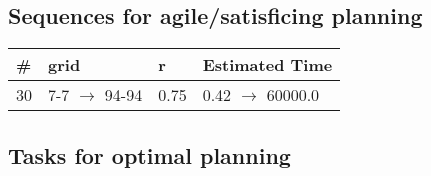 \documentclass{article}
\begin{document}
                         \subsection*{Sequences for agile/satisficing planning}

                        \begin{center}
                        \begin{tabular}{@{}l|l|l|l@{}}
                        \# & grid & r & Estimated Time\\\midrule
                        30&7-7 $\rightarrow$ 94-94&0.75&0.42 $\rightarrow$ 60000.0
                        \end{tabular}
                        \end{center}
                    
                                \subsection*{Tasks for optimal planning}
                                
\end{document}
